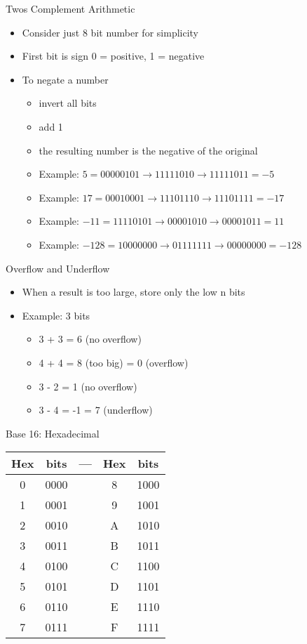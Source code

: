 \begin{withoutheadline}
\begin{frame}[fragile]{Twos Complement Arithmetic}
\begin{itemize}
    \item Consider just 8 bit number for simplicity
    \item First bit is sign 0 = positive, 1 = negative
    \item To negate a number
    \begin{itemize}
        \item invert all bits
        \item add 1
        \item the resulting number is the negative of the original
        \item Example: $   5 = 00000101 \to 11111010 \to 11111011 = -5$
        \item Example: $  17 = 00010001 \to 11101110 \to 11101111 = -17$
        \item Example: $ -11 = 11110101 \to 00001010 \to 00001011 = 11$
        \item Example: $-128 = 10000000 \to 01111111 \to 00000000 = -128$
    \end{itemize}
\end{itemize}
\end{frame}

\begin{frame}{Overflow and Underflow}
\begin{itemize}
    \item When a result is too large, store only the low n bits
    \item Example: 3 bits
    \begin{itemize}
        \item 3 + 3 = 6 (no overflow)
        \item 4 + 4 = 8 (too big) = 0 (overflow)
        \item 3 - 2 = 1 (no overflow)
        \item 3 - 4 = -1 = 7 (underflow)
    \end{itemize}
\end{itemize}
\end{frame}

\begin{frame}[fragile]{Base 16: Hexadecimal}
\begin{tabular}{c|c|c|c|c} \toprule
    Hex & bits & --- & Hex & bits  \\ \midrule 
    0 & 0000 & & 8 & 1000 \\
    1 & 0001 & & 9 & 1001 \\
    2 & 0010 & & A & 1010 \\
    3 & 0011 & & B & 1011 \\
    4 & 0100 & & C & 1100 \\
    5 & 0101 & & D & 1101 \\
    6 & 0110 & & E & 1110 \\
    7 & 0111 & & F & 1111 \\    \bottomrule
\end{tabular}
\end{frame}
    

\end{withoutheadline}

